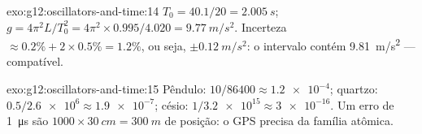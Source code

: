 \begin{solution}{exo:g12:oscillators-and-time:14}
$T_0 = 40.1/20 = \qty{2.005}{s}$;
$g = 4\pi^2 L/T_0^2 = 4\pi^2 \times 0.995/4.020 = \qty{9.77}{m/s^2}$.
Incerteza $\approx 0.2\% + 2 \times 0.5\% = 1.2\%$, ou seja,
$\pm\qty{0.12}{m/s^2}$: o intervalo contém \qty{9.81}{m/s^2} ---
compatível.
\end{solution}

\begin{solution}{exo:g12:oscillators-and-time:15}
Pêndulo: $10/86400 \approx \num{1.2e-4}$; quartzo:
$0.5/\num{2.6e6} \approx \num{1.9e-7}$; césio:
$1/\num{3.2e15} \approx \num{3e-16}$. Um erro de \qty{1}{\micro s} são
$\num{1000} \times \qty{30}{cm} = \qty{300}{m}$ de posição: o GPS precisa
da família atômica.
\end{solution}

